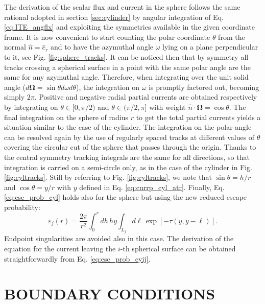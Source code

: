 \documentclass{ictt26}
\begin{document}
The derivation of the scalar flux and current in the sphere follows the same rational adopted in section \ref{sec:cylinder} by angular integration of Eq. \ref{eq:ITE_angflx} and exploiting the symmetries available in the given coordinate frame. It is now convenient to start counting the polar coordinate $\theta$ from the normal $\hat{n}=\hat{e}_r$ and to have the azymuthal angle $\omega$ lying on a plane perpendicular to it, see Fig. \ref{fig:sphere_tracks}. It can be noticed then that by symmetry all tracks crossing a spherical surface in a point with the same polar angle are the same for any azymuthal angle. Therefore, when integrating over the unit solid angle ($d\mathbf{\Omega}=\sin \theta d\omega d\theta$), the integration on $\omega$ is promptly factored out, becoming simply $2\pi$. Positive and negative radial partial currents are obtained respectively by integrating on $\theta \in [0, \pi/2)$ and $\theta \in (\pi/2, \pi]$ with weight $\hat{n} \cdot \mathbf{\Omega} = \cos \theta$. The final integration on the sphere of radius $r$ %
to get the total partial currents yields a situation similar to the case of the cylinder. The integration on the polar angle can be resolved again by the use of regularly spaced tracks at different values of $\theta$ covering the circular cut of the sphere that passes through the origin. Thanks to the central symmetry tracking integrals are the same for all directions, so that integration is carried on a semi-circle only, as in the case of the cylinder in Fig. \ref{fig:cyltracks}. Still by referring to Fig. \ref{fig:cyltracks}, we note that $\sin \theta = h/r$ and $\cos \theta = y/r$ with $y$ defined in Eq. \ref{eq:currp_cyl_atr}. Finally, Eq. \ref{eq:esc_prob_cyl} holds also for the sphere but using the new reduced escape probability:
\begin{equation}
\varepsilon_j(r) = \frac{2\pi}{r^2} \int_0^r { dh\, h y \int_{L_j}{
  d \ell \, \exp\left[-\tau( y, y - \ell )\right]}}.
\label{eq:esc_prob_sph}
\end{equation}
Endpoint singularities are avoided also in this case. The derivation of the equation for the current leaving the $i$-th spherical surface can be obtained straightforwardly from Eq. \ref{eq:esc_prob_cyij}.


\section{BOUNDARY CONDITIONS}
\label{sec:bc}
\end{document}
